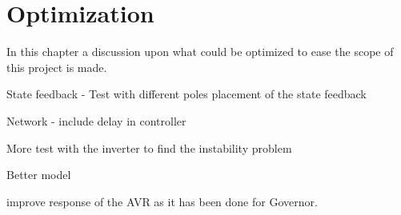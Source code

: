 \chapter{Optimization}
\label{Optimization}
In this chapter a discussion upon what could be optimized to ease the scope of this project is made.


State feedback - Test with different poles placement of the state feedback

Network - include delay in controller

More test with the inverter to find the instability problem

Better model 

improve response of the AVR as it has been done for Governor. 

